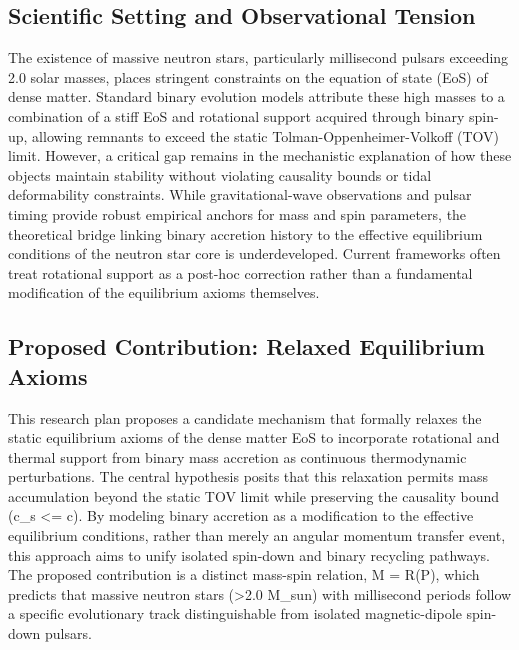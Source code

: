 \documentclass[conference]{IEEEtran}
\begin{document}
\subsection{Scientific Setting and Observational Tension}
The existence of massive neutron stars, particularly millisecond pulsars exceeding 2.0 solar masses, places stringent constraints on the equation of state (EoS) of dense matter. Standard binary evolution models attribute these high masses to a combination of a stiff EoS and rotational support acquired through binary spin-up, allowing remnants to exceed the static Tolman-Oppenheimer-Volkoff (TOV) limit. However, a critical gap remains in the mechanistic explanation of how these objects maintain stability without violating causality bounds or tidal deformability constraints. While gravitational-wave observations and pulsar timing provide robust empirical anchors for mass and spin parameters, the theoretical bridge linking binary accretion history to the effective equilibrium conditions of the neutron star core is underdeveloped. Current frameworks often treat rotational support as a post-hoc correction rather than a fundamental modification of the equilibrium axioms themselves.~\cite{cite_42e341ff6471ce89,cite_a50fdc75b0400b49}

\subsection{Proposed Contribution: Relaxed Equilibrium Axioms}
This research plan proposes a candidate mechanism that formally relaxes the static equilibrium axioms of the dense matter EoS to incorporate rotational and thermal support from binary mass accretion as continuous thermodynamic perturbations. The central hypothesis posits that this relaxation permits mass accumulation beyond the static TOV limit while preserving the causality bound (c\_s <= c). By modeling binary accretion as a modification to the effective equilibrium conditions, rather than merely an angular momentum transfer event, this approach aims to unify isolated spin-down and binary recycling pathways. The proposed contribution is a distinct mass-spin relation, M = R(P), which predicts that massive neutron stars (>2.0 M\_sun) with millisecond periods follow a specific evolutionary track distinguishable from isolated magnetic-dipole spin-down pulsars.
\end{document}
